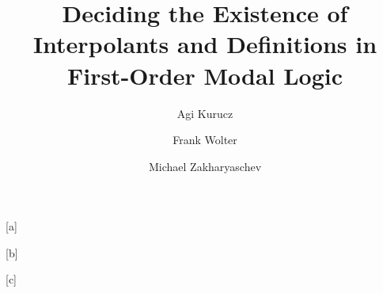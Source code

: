 \documentclass{lmcs} %
\theoremstyle{plain}\newtheorem{satz}[thm]{Satz} %
\begin{document}
		
\title[Interpolants and Definitions in First-Order Modal Logic]{Deciding the Existence of Interpolants and Definitions in First-Order Modal Logic}


	
	\author[A.~Kurucz]{Agi Kurucz}[a]
	\author[F.~Wolter]{Frank Wolter}[b]
	\author[M.~Zakharyaschev]{Michael Zakharyaschev}[c]
	
	\address{Department of Informatics, King's College London, U.K.}
	
	
	\address{Department of Computer Science, University of Liverpool, U.K.}  %
	
	
	\address{School of Computing and Mathematical Sciences, Birkbeck, University of London, U.K.}
		
	
	
	
	
\end{document}
